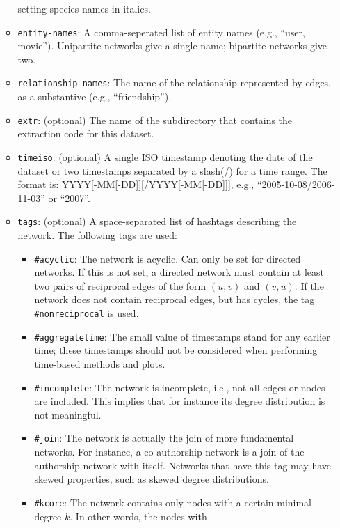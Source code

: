 \documentclass{article}
\begin{document}
\begin{itemize}
\begin{itemize}
        setting species names in italics.
      \item \texttt{entity-names}: A comma-seperated list of
        entity names (e.g., ``user, movie'').  Unipartite networks give
        a single name; bipartite networks give two.
      \item \texttt{relationship-names}: The name of the
        relationship represented by edges, as a substantive (e.g.,
        ``friendship'').
      \item \texttt{extr}: (optional) The name of the subdirectory that
        contains the extraction code for this dataset.
      \item \texttt{timeiso}: (optional) A single ISO timestamp denoting
        the date of the dataset or two timestamps separated by a
        slash(/) for a time range. The format is:
        YYYY[-MM[-DD]][/YYYY[-MM[-DD]]], e.g., ``2005-10-08/2006-11-03''
        or ``2007''.
      \item \texttt{tags}: (optional) A space-separated list of hashtags
        describing the network.  The following tags are used:
        \begin{itemize}
        \item \texttt{\#acyclic}:  The network is acyclic.  Can only be
          set for directed networks.  If this is not set, a directed
          network must contain at least two pairs of reciprocal edges of
          the form $(u,v)$ and $(v,u)$.  If the network does not contain
          reciprocal edges, but has cycles, the tag
          \texttt{\#nonreciprocal} is used.
        \item \texttt{\#aggregatetime}:  The small value of timestamps
          stand for any earlier time; these timestamps should not be
          considered when performing time-based methods and plots. 
        \item \texttt{\#incomplete}: The network is incomplete, i.e.,
          not all edges or nodes are included.  This implies that for
          instance its degree distribution is not meaningful.
        \item \texttt{\#join}:  The network is actually the join of more
          fundamental networks.  For instance, a co-authorship network
          is a join of the authorship network with itself.  Networks
          that have this tag may have skewed properties, such as skewed
          degree distributions.
        \item \texttt{\#kcore}: The network contains only nodes with a
          certain minimal degree $k$. In other words, the nodes with

\end{itemize}
\end{itemize}
\end{itemize}
\end{document}
